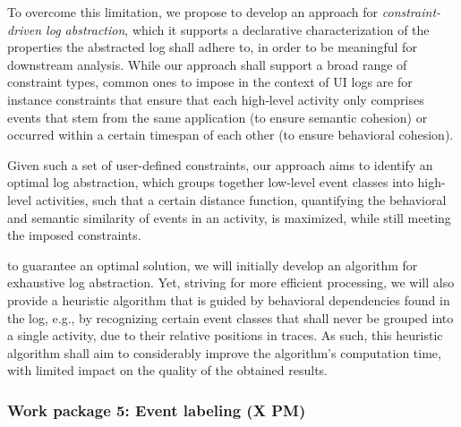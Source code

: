 To overcome this limitation, we propose to develop an approach for \emph{constraint-driven log abstraction}, which it supports a declarative characterization of the properties the abstracted log shall adhere to, in order to be meaningful for downstream analysis. While our approach shall support a broad range of constraint types, common ones to impose in the context of UI logs are for instance constraints that ensure that each high-level activity only comprises events that stem from the same application (to ensure semantic cohesion) or occurred within a certain timespan of each other (to ensure behavioral cohesion). 

Given such a set of user-defined constraints, our approach aims to identify an optimal log abstraction, which groups together low-level event classes into high-level activities, such that a certain distance function, quantifying the behavioral and semantic similarity of events in an activity, is maximized, while still meeting the imposed constraints.

to guarantee an optimal solution, we will initially develop an algorithm for exhaustive log abstraction. Yet, striving for more efficient processing, we will also provide a heuristic algorithm that is guided by behavioral dependencies found in the log, e.g., by recognizing certain event classes that shall never be grouped into a single activity, due to their relative positions in traces.
As such, this heuristic algorithm shall aim to considerably improve the algorithm's computation time, with limited impact on the quality of the obtained results.



\subsubsection{Work package 5: Event labeling (X PM)}
\label{sec:wp5}


